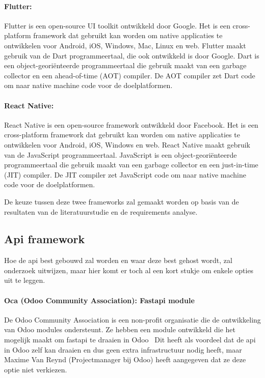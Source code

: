 \paragraph{Flutter:}
Flutter is een open-source UI toolkit ontwikkeld door Google.
Het is een cross-platform framework dat gebruikt kan worden om native applicaties te ontwikkelen voor Android, iOS, Windows, Mac, Linux en web.
Flutter maakt gebruik van de Dart programmeertaal, die ook ontwikkeld is door Google.
Dart is een object-georiënteerde programmeertaal die gebruik maakt van een garbage collector en een ahead-of-time (AOT) compiler.
De AOT compiler zet Dart code om naar native machine code voor de doelplatformen.

\paragraph{React Native:}
React Native is een open-source framework ontwikkeld door Facebook.
Het is een cross-platform framework dat gebruikt kan worden om native applicaties te ontwikkelen voor Android, iOS, Windows en web.
React Native maakt gebruik van de JavaScript programmeertaal.
JavaScript is een object-georiënteerde programmeertaal die gebruik maakt van een garbage collector en een just-in-time (JIT) compiler.
De JIT compiler zet JavaScript code om naar native machine code voor de doelplatformen.

\bigskip

De keuze tussen deze twee frameworks zal gemaakt worden op basis van de resultaten van de literatuurstudie en de requirements analyse.


\subsection{Api framework}%
\label{subsec:api_framework}

Hoe de api best gebouwd zal worden en waar deze best gehost wordt, zal onderzoek uitwijzen, maar hier komt er toch al een kort stukje om enkele opties uit te leggen.

\paragraph*{Oca (Odoo Community Association): Fastapi module}
De Odoo Community Association is een non-profit organisatie die de ontwikkeling van Odoo modules ondersteunt.
Ze hebben een module ontwikkeld die het mogelijk maakt om fastapi te draaien in Odoo~\autocite{ocaRestFramework2023}
Dit heeft als voordeel dat de api in Odoo zelf kan draaien en dus geen extra infrastructuur nodig heeft, 
maar Maxime Van Reynd (Projectmanager bij Odoo) heeft aangegeven dat ze deze optie niet verkiezen.

